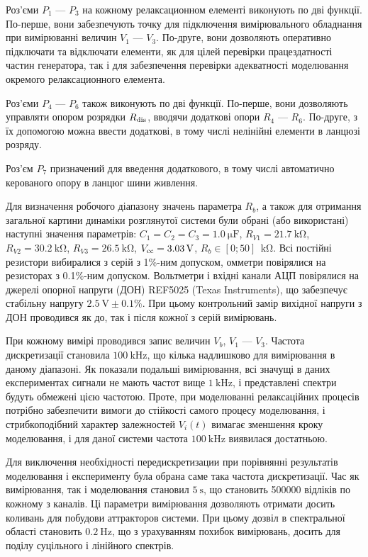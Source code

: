 Роз'єми
$ P_1 $ --- $ P_3 $ на кожному релаксационном елементі виконують по дві
функції. По-перше, вони забезпечують точку для підключення
вимірювального обладнання при вимірюванні величин
$ V_1 $ --- $ V_3 $. По-друге, вони дозволяють оперативно підключати та
відключати елементи, як для цілей перевірки працездатності
частин генератора, так і для забезпечення перевірки
адекватності моделювання окремого релаксационного елемента.


Роз'єми
$P_4$ --- $ P_6 $ також виконують по дві функції. По-перше, вони дозволяють
управляти опором розрядки
$R _\mathrm{dis} $, вводячи додаткові опори 
$R_4$ --- $R_6$. По-друге, з їх допомогою можна ввести додаткові, в тому
числі нелінійні елементи в ланцюзі розряду.

Роз'єм
$ P_7 $ призначений для введення додаткового, в тому числі
автоматично керованого опору в ланцюг шини живлення.

Для визначення робочого діапазону значень параметра
$ R_b $, а також для отримання загальної картини динаміки
розглянутої системи були обрані (або використані) наступні
значення параметрів:
$C_1 = C_2 = C_3 = \SI{1.0}{\micro\farad}$,
$R_{V1} = \SI{21.7}{\kilo\ohm}$,
$R_{V2} = \SI{30.2}{\kilo\ohm}$,
$R_{V3} = \SI{26.5}{\kilo\ohm}$,
$V_\mathrm{cc} = \SI{3.03}{\volt}$,
$R_{b} \in [0;50]~ \SI{}{\kilo\ohm}$.
Всі постійні резистори вибиралися з серій з 1\%-ним допуском,
омметри повірялися на резисторах з 0.1\%-ним допуском. Вольтметри
і вхідні канали АЦП повірялися на джерелі опорної напруги (ДОН)
REF5025 (Texas Instruments), що забезпечує стабільну напругу
$\SI{2.5}{\volt} \pm 0.1 \% $. При цьому контрольний замір вихідної напруги
з ДОН проводився як до, так і після кожної з серій вимірювань.

При кожному вимірі проводився запис величин
$ V_b $, $ V_1 $ --- $ V_3 $. Частота дискретизації становила
$ \SI{100}{\kilo \hertz} $, що кілька надлишково для вимірювання в даному
діапазоні. Як показали подальші вимірювання, всі значущі в
даних експериментах сигнали не мають частот вище
$ \SI{1}{\kilo \hertz} $, і представлені спектри будуть обмежені цією
частотою. Проте, при моделюванні релаксаційних процесів
потрібно забезпечити вимоги до стійкості самого процесу
моделювання, і стрибкоподібний характер залежностей
$ V_i (t) $ вимагає зменшення кроку моделювання, і для даної системи
частота
$ \SI{100}{\kilo \hertz} $ виявилася достатньою.

Для виключення необхідності передискретизации при порівнянні
результатів моделювання і експерименту була обрана саме така
частота дискретизації. Час як вимірювання, так і моделювання
становил
$ \SI{5}{\s} $, що становить 500000 відліків по кожному з каналів. Ці
параметри вимірювання дозволяють отримати досить коливань для
побудови аттракторов системи. При цьому дозвіл в спектральної
області становить
$ \SI{0.2}{\hertz} $, що з урахуванням похибок вимірювань, досить для
поділу суцільного і лінійного спектрів.


